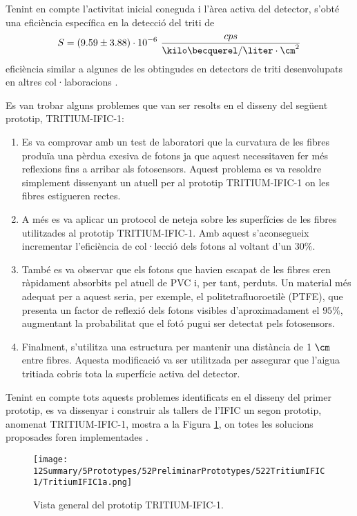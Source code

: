Tenint en compte l'activitat inicial coneguda i l'àrea activa del detector, s'obté una eficiència específica en la detecció del triti de
$$S = (9.59 \pm 3.88)\cdot{} 10^{-6}~\frac{cps}{\kilo\becquerel/\liter \cdot{} \cm^{2}}$$
eficiència similar a algunes de les obtingudes en detectors de triti desenvolupats en altres col·laboracions \cite{Muramatsu, Moghissi}.

Es van trobar alguns problemes que van ser resolts en el disseny del següent prototip, TRITIUM-IFIC-1:

\begin{enumerate}
\item{} Es va comprovar amb un test de laboratori que la curvatura de les fibres produïa una pèrdua exesiva de fotons ja que aquest necessitaven fer més reflexions fins a arribar als fotosensors. Aquest problema es va resoldre simplement dissenyant un atuell per al prototip TRITIUM-IFIC-1 on les fibres estigueren rectes.

\item{} A més es va aplicar un protocol de neteja sobre les superfícies de les fibres utilitzades al prototip TRITIUM-IFIC-1. Amb aquest s'aconsegueix incrementar l'eficiència de col·lecció dels fotons al voltant d'un $30\%$.

\item{} També es va observar que els fotons que havien escapat de les fibres eren ràpidament absorbits pel atuell de PVC i, per tant, perduts. Un material més adequat per a aquest seria, per exemple, el politetrafluoroetilè (PTFE), que presenta un factor de reflexió dels fotons visibles d'aproximadament el $95\%$, augmentant la probabilitat que el fotó pugui ser detectat pels fotosensors.

\item{} Finalment, s'utilitza una estructura per mantenir una distància de $1~\cm$ entre fibres. Aquesta modificació va ser utilitzada per assegurar que l'aigua tritiada cobris tota la superfície activa del detector.

\end{enumerate}

Tenint en compte tots aquests problemes identificats en el disseny del primer prototip, es va dissenyar i construir als tallers de l'IFIC un segon prototip, anomenat TRITIUM-IFIC-1, mostra a la Figura \ref{fig:TritumIFIC1s}, on totes les solucions proposades foren implementades .

\begin{figure}[h]
\centering
\texttt{[image: 12Summary/5Prototypes/52PreliminarPrototypes/522TritiumIFIC1/TritiumIFIC1a.png]}
\caption{Vista general del prototip TRITIUM-IFIC-1.\label{fig:TritumIFIC1s}}
\end{figure}

